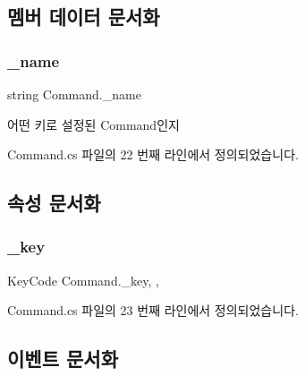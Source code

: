 \subsection{멤버 데이터 문서화}
\mbox{\label{class_command_a18a8a95d7f2c65bfa786fb525c42d0c4}} 
\subsubsection{\texorpdfstring{\_name}{\_name}}
{\footnotesize\ttfamily string Command.\+\_\+name}



어떤 키로 설정된 Command인지 



Command.\+cs 파일의 22 번째 라인에서 정의되었습니다.



\subsection{속성 문서화}
\mbox{\label{class_command_a85e9adc5f9994f8da6b21bbad6dfb13d}} 
\subsubsection{\texorpdfstring{\_key}{\_key}}
{\footnotesize\ttfamily Key\+Code Command.\+\_\+key\hspace{0.3cm}{\ttfamily [get]}, {\ttfamily [set]}, {\ttfamily [private]}}



Command.\+cs 파일의 23 번째 라인에서 정의되었습니다.


\begin{DoxyCode}{0}

\end{DoxyCode}


\subsection{이벤트 문서화}
\mbox{\label{class_command_a04f1a7e0dc8e999e0fca2aa9210f73a3}} 
